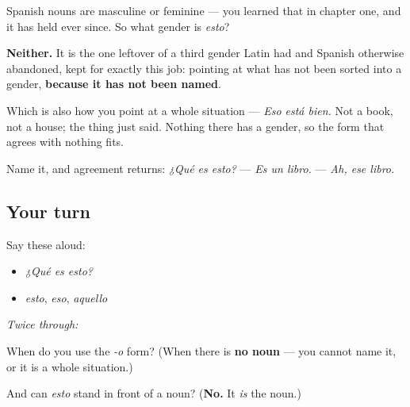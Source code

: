 \begin{culture}
Spanish nouns are masculine or feminine — you learned that in chapter one, and it has held ever since. So what gender is \emph{esto}?

\textbf{Neither.} It is the one leftover of a third gender Latin had and Spanish otherwise abandoned, kept for exactly this job: pointing at what has not been sorted into a gender, \textbf{because it has not been named}.

Which is also how you point at a whole situation — \emph{Eso está bien.} Not a book, not a house; the thing just said. Nothing there has a gender, so the form that agrees with nothing fits.

Name it, and agreement returns: \emph{¿Qué es esto?} — \emph{Es un libro.} — \emph{Ah, ese libro.}
\end{culture}

\subsection*{Your turn}
Say these aloud:

\begin{itemize}
\raggedright
  \item \emph{¿Qué es esto?}
  \item \emph{esto}, \emph{eso}, \emph{aquello}
\end{itemize}

\emph{Twice through:}

\begin{tcolorbox}[breakable,colback=teal!4,colframe=teal!35!black,title={Before you move on}]
When do you use the \emph{-o} form? (When there is \textbf{no noun} — you cannot name it, or it is a whole situation.)

And can \emph{esto} stand in front of a noun? (\textbf{No.} It \emph{is} the noun.)
\end{tcolorbox}
